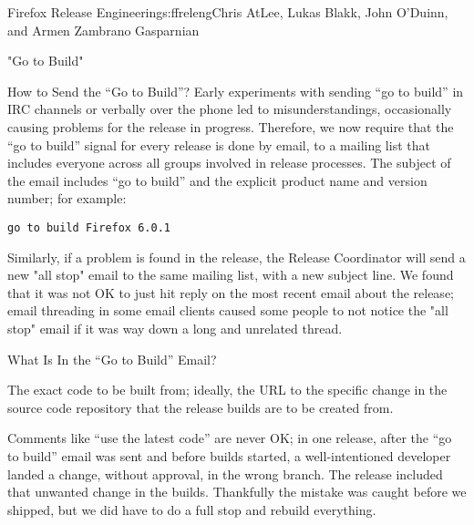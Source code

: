 \begin{aosachapter}{Firefox Release Engineering}{s:ffreleng}{Chris AtLee, Lukas Blakk, John O'Duinn, and Armen Zambrano Gasparnian}
\begin{aosasect1}{"Go to Build"}
\begin{aosasect2}{How to Send the ``Go to Build''?}
Early experiments with sending ``go to build'' in IRC channels or
verbally over the phone led to misunderstandings,
occasionally causing problems for the release in progress. Therefore,
we now require that the ``go to build'' signal for every release is
done by email, to a mailing list that includes everyone across all
groups involved in release processes. The subject of the email
includes ``go to build'' and the explicit product name and version
number; for example:

\begin{verbatim}
go to build Firefox 6.0.1
\end{verbatim}

Similarly, if a problem is found in the release, the Release
Coordinator will send a new "all stop" email to the same mailing list,
with a new subject line. We found that it was not OK to just hit reply
on the most recent email about the release; email threading in some
email clients caused some people to not notice the "all stop" email if
it was way down a long and unrelated thread.

\end{aosasect2}

\begin{aosasect2}{What Is In the ``Go to Build'' Email?}

\begin{aosaenumerate}

\item The exact code to be built from; ideally, the URL to the
specific change in the source code repository that the release builds are
to be created from.

  \begin{aosaenumerate2}

    \item Comments like ``use the latest code'' are never OK; in one
      release, after the ``go to build'' email was sent and before
      builds started, a well-intentioned developer landed a change,
      without approval, in the wrong branch. The release included that
      unwanted change in the builds. Thankfully the mistake was
      caught before we shipped, but we did have to do a full stop and
      rebuild everything.


\end{aosaenumerate2}
\end{aosaenumerate}
\end{aosasect2}
\end{aosasect1}
\end{aosachapter}
